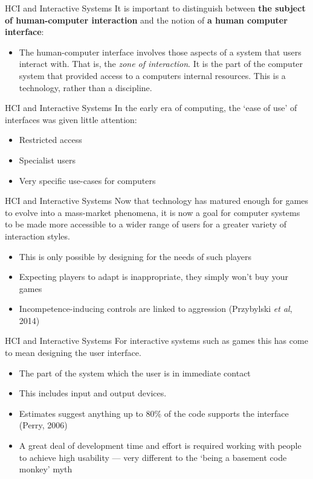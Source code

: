 \begin{frame}{HCI and Interactive Systems}
	It is important to distinguish between \textbf{the subject of human-computer interaction} and the notion of
	\textbf{a human computer interface}:
	\begin{itemize}
		\item The human-computer interface involves those aspects of a system that users interact with. That is,
		the \textit{zone of interaction}. It is the part of the computer system that provided access to a computers
		internal resources. This is a technology, rather than a discipline.
	\end{itemize}
\end{frame}

\begin{frame}{HCI and Interactive Systems}
	In the early era of computing, the `ease of use' of interfaces was given little attention:
	\begin{itemize}
		\item Restricted access
		\item Specialist users
		\item Very specific use-cases for computers
	\end{itemize}
\end{frame}

\begin{frame}{HCI and Interactive Systems}
	Now that technology has matured enough for games to evolve into a mass-market phenomena, it is now a goal for
	computer systems to be made more accessible to a wider range of users for a greater variety of interaction styles. 
	\begin{itemize}
		\item This is only possible by designing for the needs of such players
		\item Expecting players to adapt is inappropriate, they simply won't buy your games
		\item Incompetence-inducing controls are linked to aggression (Przybylski \textit{et al}, 2014)
	\end{itemize}
\end{frame}

\begin{frame}{HCI and Interactive Systems}
	For interactive systems such as games this has come to mean designing the user interface. 
	\begin{itemize}
		\item The part of the system which the user is in immediate contact
		\item This includes input and output devices.
		\item Estimates suggest anything up to 80\% of the code supports the interface (Perry, 2006)
		\item A great deal of development time and effort is required working with people to achieve high usability --- 
		very different to the `being a basement code monkey' myth
	\end{itemize}
\end{frame}

